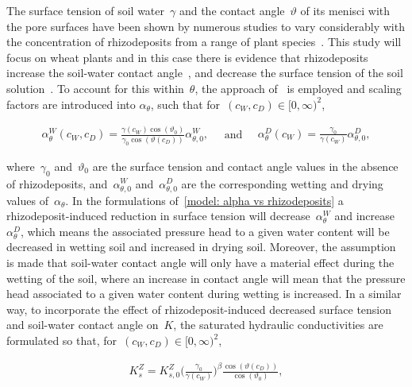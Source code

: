 \documentclass[11pt,a4paper]{article}
\numberwithin{equation}{section}
\begin{document}
The surface tension of soil water~$\gamma$ and the contact angle~$\vartheta$ of its menisci with the pore surfaces have been shown by numerous studies to vary considerably with the concentration of rhizodeposits from a range of plant species~\citep{ahmed2016drying, naveed2018rhizosphere, naveed2019surface}. This study will focus on wheat plants and in this case there is evidence that rhizodeposits increase the soil-water contact angle~\citep{zickenrott2016efficient}, and decrease the surface tension of the soil solution~\citep{read2003plant}. To account for this within~$\theta$, the approach of~\cite{karagunduz2001influence} is employed and scaling factors are introduced into $\alpha_\theta$, such that for~$(c_W,c_D)\in[0,\infty)^2$, 
\begin{linenomath*}
	\begin{equation}\label{model: alpha vs rhizodeposits}
		\begin{aligned}
			\alpha_\theta^W(c_W,c_D) = \frac{\gamma(c_W)\cos(\vartheta_0)}{\gamma_0\cos(\vartheta(c_D))}\alpha_{\theta, 0}^W,
		\end{aligned}
		\quad
		\text{and}
		\quad
		\begin{aligned}
			\alpha_\theta^D(c_W) = 
			\frac{\gamma_0}{\gamma(c_W)}\alpha_{\theta, 0}^D,			 
		\end{aligned}
	\end{equation}
\end{linenomath*}
where~$\gamma_0$ and~$\vartheta_0$ are the surface tension and contact angle values in the absence of rhizodeposits, and~$\alpha_{\theta,0}^W$ and~$\alpha_{\theta,0}^D$ are the corresponding wetting and drying values of~$\alpha_\theta$. In the formulations of~\eqref{model: alpha vs rhizodeposits} a rhizodeposit-induced reduction in surface tension will decrease~$\alpha_\theta^W$ and increase~$\alpha_\theta^D$, which means the associated pressure head to a given water content will be decreased in wetting soil and increased in drying soil. Moreover, the assumption is made that soil-water contact angle will only have a material effect during the wetting of the soil, where an increase in contact angle will mean that the pressure head associated to a given water content during wetting is increased. In a similar way, to incorporate the effect of rhizodeposit-induced decreased surface tension and soil-water contact angle on~$K$, the saturated hydraulic conductivities are formulated so that, for~$(c_W,c_D)\in[0,\infty)^2$,
\begin{linenomath*}
	\begin{equation}\label{model: Ks vs rhizodeposits}
		\begin{aligned}
			K_s^Z = K_{s,0}^Z\Big(\frac{\gamma_0}{\gamma(c_W)}\Big)^\beta\frac{\cos(\vartheta(c_D))}{\cos(\vartheta_0)},
		\end{aligned}
	\end{equation}
\end{linenomath*}
\end{document}
